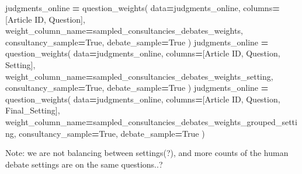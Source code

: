 \documentclass[
]{article}
\newenvironment{Shaded}{\begin{snugshade}}{\end{snugshade}}
\newcommand{\NormalTok}[1]{#1}
\newcommand{\OperatorTok}[1]{\textcolor[rgb]{0.81,0.36,0.00}{\textbf{#1}}}
\newcommand{\StringTok}[1]{\textcolor[rgb]{0.31,0.60,0.02}{#1}}
\newcommand{\VariableTok}[1]{\textcolor[rgb]{0.00,0.00,0.00}{#1}}
\begin{document}
\begin{Shaded}
\begin{Highlighting}[]


\NormalTok{judgments\_online }\OperatorTok{=}\NormalTok{ question\_weights(}
\NormalTok{    data}\OperatorTok{=}\NormalTok{judgments\_online, }
\NormalTok{    columns}\OperatorTok{=}\NormalTok{[}\StringTok{\textquotesingle{}Article ID\textquotesingle{}}\NormalTok{, }\StringTok{\textquotesingle{}Question\textquotesingle{}}\NormalTok{], }
\NormalTok{    weight\_column\_name}\OperatorTok{=}\StringTok{\textquotesingle{}sampled\_consultancies\_debates\_weights\textquotesingle{}}\NormalTok{,}
\NormalTok{    consultancy\_sample}\OperatorTok{=}\VariableTok{True}\NormalTok{,}
\NormalTok{    debate\_sample}\OperatorTok{=}\VariableTok{True}
\NormalTok{)}
\NormalTok{judgments\_online }\OperatorTok{=}\NormalTok{ question\_weights(}
\NormalTok{    data}\OperatorTok{=}\NormalTok{judgments\_online, }
\NormalTok{    columns}\OperatorTok{=}\NormalTok{[}\StringTok{\textquotesingle{}Article ID\textquotesingle{}}\NormalTok{, }\StringTok{\textquotesingle{}Question\textquotesingle{}}\NormalTok{, }\StringTok{\textquotesingle{}Setting\textquotesingle{}}\NormalTok{], }
\NormalTok{    weight\_column\_name}\OperatorTok{=}\StringTok{\textquotesingle{}sampled\_consultancies\_debates\_weights\_setting\textquotesingle{}}\NormalTok{,}
\NormalTok{    consultancy\_sample}\OperatorTok{=}\VariableTok{True}\NormalTok{,}
\NormalTok{    debate\_sample}\OperatorTok{=}\VariableTok{True}
\NormalTok{)}
\NormalTok{judgments\_online }\OperatorTok{=}\NormalTok{ question\_weights(}
\NormalTok{    data}\OperatorTok{=}\NormalTok{judgments\_online, }
\NormalTok{    columns}\OperatorTok{=}\NormalTok{[}\StringTok{\textquotesingle{}Article ID\textquotesingle{}}\NormalTok{, }\StringTok{\textquotesingle{}Question\textquotesingle{}}\NormalTok{, }\StringTok{\textquotesingle{}Final\_Setting\textquotesingle{}}\NormalTok{], }
\NormalTok{    weight\_column\_name}\OperatorTok{=}\StringTok{\textquotesingle{}sampled\_consultancies\_debates\_weights\_grouped\_setting\textquotesingle{}}\NormalTok{,}
\NormalTok{    consultancy\_sample}\OperatorTok{=}\VariableTok{True}\NormalTok{,}
\NormalTok{    debate\_sample}\OperatorTok{=}\VariableTok{True}
\NormalTok{)}
\end{Highlighting}
\end{Shaded}

Note: we are not balancing between settings(?), and more counts of the
human debate settings are on the same questions..?
\end{document}
